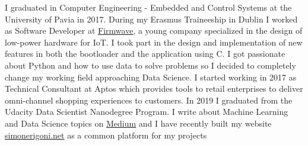 \documentclass[9pt]{developercv} %
\begin{document}
\begin{minipage}[t]{0.5\textwidth} %
	\vspace{-\baselineskip} %
	
	I graduated in Computer Engineering - Embedded and Control Systems at the University of Pavia in 2017. During my Erasmus Traineeship in Dublin I worked as Software Developer at \underline{\href{https://iot.taoglas.com/}{Firmwave}}, a young company specialized in the design of low-power hardware for IoT. I took part in the design and implementation of new features in both the bootloader and the application using C. I got passionate about Python and how to use data to solve problems so I decided to completely change my working field approaching Data Science. I started working in 2017 as Technical Consultant at Aptos which provides tools to retail enterprises to deliver omni-channel shopping experiences to customers. In 2019 I graduated from the Udacity Data Scientist Nanodegree Program. I write about Machine Learning and Data Science topics on \underline{\href{https://medium.com/@simone.rigoni01}{Medium}} and I have recently built my website \underline{\href{http://www.simonerigoni.net}{simonerigoni.net}} as a common platform for my projects
\end{minipage}
\hfill %
\begin{minipage}[t]{0.4\textwidth} %
	\vspace{-\baselineskip} %
	\begin{barchart}{5.5}
	\end{barchart}
\end{minipage}

\begin{center}
\end{center}


\end{document}

